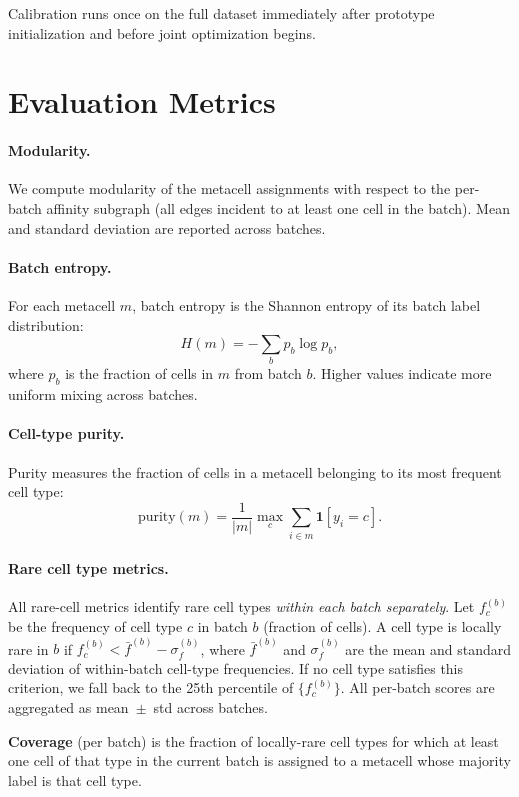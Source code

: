 Calibration runs once on the full dataset immediately after prototype initialization and before joint optimization begins.

\section{Evaluation Metrics}
\label{app:metrics}

\paragraph{Modularity.}
We compute modularity of the metacell assignments with respect to the per-batch affinity subgraph (all edges incident to at least one cell in the batch). Mean and standard deviation are reported across batches.

\paragraph{Batch entropy.}
For each metacell $m$, batch entropy is the Shannon entropy of its batch label distribution:
\[
H(m) = -\sum_b p_b \log p_b,
\]
where $p_b$ is the fraction of cells in $m$ from batch $b$. Higher values indicate more uniform mixing across batches.

\paragraph{Cell-type purity.}
Purity measures the fraction of cells in a metacell belonging to its most frequent cell type:
\[
\text{purity}(m) = \frac{1}{|m|} \max_{c} \sum_{i \in m} \mathbf{1}[y_i = c].
\]

\paragraph{Rare cell type metrics.}
All rare-cell metrics identify rare cell types \emph{within each batch separately}.
Let $f_c^{(b)}$ be the frequency of cell type $c$ in batch $b$ (fraction of cells).
A cell type is locally rare in $b$ if $f_c^{(b)} < \bar{f}^{(b)} - \sigma_f^{(b)}$, where $\bar{f}^{(b)}$ and $\sigma_f^{(b)}$ are the mean and standard deviation of within-batch cell-type frequencies.
If no cell type satisfies this criterion, we fall back to the 25th percentile of $\{f_c^{(b)}\}$.
All per-batch scores are aggregated as mean~$\pm$~std across batches.

\textbf{Coverage} (per batch) is the fraction of locally-rare cell types for which at least one cell of that type in the current batch is assigned to a metacell whose majority label is that cell type.

